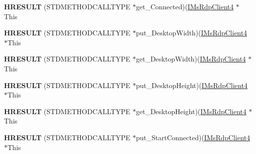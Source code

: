 \begin{DoxyCompactItemize}
\item 
\mbox{\label{struct_m_s_t_s_c_lib_1_1_i_ms_rdp_client4_vtbl_a25288224fe900a8e2c4bc11f36c0dc80}} 
{\bfseries H\+R\+E\+S\+U\+LT} (S\+T\+D\+M\+E\+T\+H\+O\+D\+C\+A\+L\+L\+T\+Y\+PE $\ast$get\+\_\+\+Connected)(\hyperlink{interface_m_s_t_s_c_lib_1_1_i_ms_rdp_client4}{I\+Ms\+Rdp\+Client4} $\ast$This
\item 
\mbox{\label{struct_m_s_t_s_c_lib_1_1_i_ms_rdp_client4_vtbl_a9ae2d10d0b17cf4cebcfe2a10c741473}} 
{\bfseries H\+R\+E\+S\+U\+LT} (S\+T\+D\+M\+E\+T\+H\+O\+D\+C\+A\+L\+L\+T\+Y\+PE $\ast$put\+\_\+\+Desktop\+Width)(\hyperlink{interface_m_s_t_s_c_lib_1_1_i_ms_rdp_client4}{I\+Ms\+Rdp\+Client4} $\ast$This
\item 
\mbox{\label{struct_m_s_t_s_c_lib_1_1_i_ms_rdp_client4_vtbl_a9722261e5409a023b418b9aa8832d132}} 
{\bfseries H\+R\+E\+S\+U\+LT} (S\+T\+D\+M\+E\+T\+H\+O\+D\+C\+A\+L\+L\+T\+Y\+PE $\ast$get\+\_\+\+Desktop\+Width)(\hyperlink{interface_m_s_t_s_c_lib_1_1_i_ms_rdp_client4}{I\+Ms\+Rdp\+Client4} $\ast$This
\item 
\mbox{\label{struct_m_s_t_s_c_lib_1_1_i_ms_rdp_client4_vtbl_a7951bdaa1bc52b0597220b333a33c646}} 
{\bfseries H\+R\+E\+S\+U\+LT} (S\+T\+D\+M\+E\+T\+H\+O\+D\+C\+A\+L\+L\+T\+Y\+PE $\ast$put\+\_\+\+Desktop\+Height)(\hyperlink{interface_m_s_t_s_c_lib_1_1_i_ms_rdp_client4}{I\+Ms\+Rdp\+Client4} $\ast$This
\item 
\mbox{\label{struct_m_s_t_s_c_lib_1_1_i_ms_rdp_client4_vtbl_a30ff1817a50fc8817a27697179a40a7f}} 
{\bfseries H\+R\+E\+S\+U\+LT} (S\+T\+D\+M\+E\+T\+H\+O\+D\+C\+A\+L\+L\+T\+Y\+PE $\ast$get\+\_\+\+Desktop\+Height)(\hyperlink{interface_m_s_t_s_c_lib_1_1_i_ms_rdp_client4}{I\+Ms\+Rdp\+Client4} $\ast$This
\item 
\mbox{\label{struct_m_s_t_s_c_lib_1_1_i_ms_rdp_client4_vtbl_a89b805357df34f9ff428ebf91dab469f}} 
{\bfseries H\+R\+E\+S\+U\+LT} (S\+T\+D\+M\+E\+T\+H\+O\+D\+C\+A\+L\+L\+T\+Y\+PE $\ast$put\+\_\+\+Start\+Connected)(\hyperlink{interface_m_s_t_s_c_lib_1_1_i_ms_rdp_client4}{I\+Ms\+Rdp\+Client4} $\ast$This

\end{DoxyCompactItemize}
